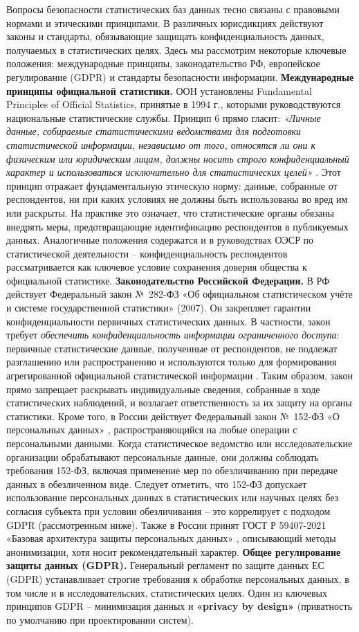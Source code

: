 Вопросы безопасности статистических баз данных тесно связаны с правовыми нормами и этическими принципами. В различных юрисдикциях действуют законы и стандарты, обязывающие защищать конфиденциальность данных, получаемых в статистических целях. Здесь мы рассмотрим некоторые ключевые положения: международные принципы, законодательство РФ, европейское регулирование (GDPR) и стандарты безопасности информации. \textbf{Международные принципы официальной статистики.} ООН установлены Fundamental Principles of Official Statistics, принятые в 1994 г., которыми руководствуются национальные статистические службы. Принцип 6 прямо гласит: \textit{«Личные данные, собираемые статистическими ведомствами для подготовки статистической информации, независимо от того, относятся ли они к физическим или юридическим лицам, должны носить строго конфиденциальный характер и использоваться исключительно для статистических целей»} \autocite{unstats-un-org}. Этот принцип отражает фундаментальную этическую норму: данные, собранные от респондентов, ни при каких условиях не должны быть использованы во вред им или раскрыты. На практике это означает, что статистические органы обязаны внедрять меры, предотвращающие идентификацию респондентов в публикуемых данных. Аналогичные положения содержатся и в руководствах ОЭСР по статистической деятельности – конфиденциальность респондентов рассматривается как ключевое условие сохранения доверия общества к официальной статистике. \textbf{Законодательство Российской Федерации.} В РФ действует Федеральный закон № 282-ФЗ «Об официальном статистическом учёте и системе государственной статистики» (2007). Он закрепляет гарантии конфиденциальности первичных статистических данных. В частности, закон требует \textit{обеспечить конфиденциальность информации ограниченного доступа}: первичные статистические данные, полученные от респондентов, не подлежат разглашению или распространению и используются только для формирования агрегированной официальной статистической информации \autocite{rg-ru}. Таким образом, закон прямо запрещает раскрывать индивидуальные сведения, собранные в ходе статистических наблюдений, и возлагает ответственность за их защиту на органы статистики. Кроме того, в России действует Федеральный закон № 152-ФЗ «О персональных данных» \autocite{FZ152}, распространяющийся на любые операции с персональными данными. Когда статистическое ведомство или исследовательские организации обрабатывают персональные данные, они должны соблюдать требования 152-ФЗ, включая применение мер по обезличиванию при передаче данных в обезличенном виде. Следует отметить, что 152-ФЗ допускает использование персональных данных в статистических или научных целях без согласия субъекта при условии обезличивания – это коррелирует с подходом GDPR (рассмотренным ниже). Также в России принят ГОСТ Р 59407-2021 «Базовая архитектура защиты персональных данных» \autocite{GOST}, описывающий методы анонимизации, хотя носит рекомендательный характер. \textbf{Общее регулирование защиты данных (GDPR).} Генеральный регламент по защите данных ЕС (GDPR) устанавливает строгие требования к обработке персональных данных, в том числе и в исследовательских, статистических целях. Один из ключевых принципов GDPR – минимизация данных и \textbf{«privacy by design»} (приватность по умолчанию при проектировании систем). 